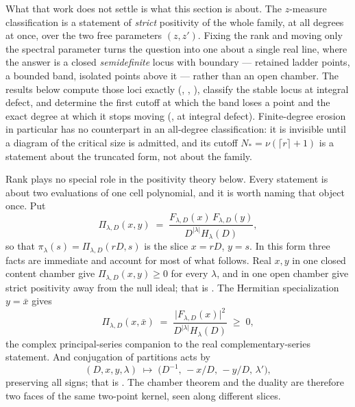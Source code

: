 \documentclass[11pt,letterpaper]{article}
\begin{document}
What that work does not settle is what this section is about. The $z$-measure
classification is a statement of \emph{strict} positivity of the whole family,
at all degrees at once, over the two free parameters $(z,z')$. Fixing the rank
and moving only the spectral parameter turns the question into one about a
single real line, where the answer is a closed \emph{semidefinite} locus with
boundary --- retained ladder points, a bounded band, isolated points above it ---
rather than an open chamber. The results below compute those loci exactly
(, , ), classify the stable locus at integral defect,
and determine the first cutoff at which the band loses a point and the exact
degree at which it stops moving (, at integral defect). Finite-degree
erosion in particular has no counterpart in an all-degree classification: it is
invisible until a diagram of the critical size is admitted, and its cutoff
$N_*=\nu(\lceil r\rceil+1)$ is a statement about the truncated form, not about
the family.

\begin{remark}
\label{rem:twopoint}
Rank plays no special role in the positivity theory below. Every statement is
about two evaluations of one cell polynomial, and it is worth naming that object
once. Put
\begin{equation}
  \Pi_{\lambda,D}(x,y)\;=\;
  \frac{F_{\lambda,D}(x)\,F_{\lambda,D}(y)}{D^{|\lambda|}H_\lambda(D)} ,
  \label{eq:twopoint}
\end{equation}
so that $\pi_\lambda(s)=\Pi_{\lambda,D}(rD,s)$ is the slice $x=rD$, $y=s$. In this
form three facts are immediate and account for most of what follows. Real $x,y$
in one closed content chamber give $\Pi_{\lambda,D}(x,y)\ge0$ for every $\lambda$,
and in one open chamber give strict positivity away from the null ideal; that is
. The Hermitian specialization $y=\bar x$ gives
\begin{equation}
  \Pi_{\lambda,D}(x,\bar x)
  \;=\;\frac{\lvert F_{\lambda,D}(x)\rvert^{2}}{D^{|\lambda|}H_\lambda(D)}\;\ge\;0 ,
  \label{eq:hermitian}
\end{equation}
the complex principal-series companion to the real complementary-series
statement. And conjugation of partitions acts by
\begin{equation}
  (D,x,y,\lambda)\;\longmapsto\;
  \bigl(D^{-1},\,-x/D,\,-y/D,\,\lambda'\bigr),
  \label{eq:twopointdual}
\end{equation}
preserving all signs; that is . The chamber theorem and the
duality are therefore two faces of the same two-point kernel, seen along
different slices.
\end{remark}
\end{document}
